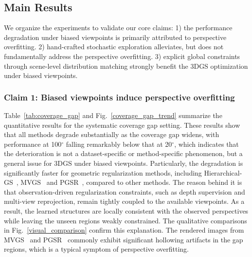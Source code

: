 \documentclass[lettersize,journal]{IEEEtran}
\begin{document}
\subsection{Main Results}


We organize the experiments to validate our core claims: 
1) the performance degradation under biased viewpoints is primarily attributed 
to perspective overfitting.
2) hand-crafted stochastic exploration alleviates, but does not fundamentally address the perspective overfitting. 
3) explicit global constraints through scene-level distribution matching strongly benefit the 3DGS optimization under biased viewpoints. 


\subsubsection{Claim 1: Biased viewpoints induce perspective overfitting}


Table~\ref{tab:coverage_gap} and Fig.~\ref{coverage_gap_trend} summarize the quantitative results for the systematic coverage gap setting. 
These results show that all methods degrade substantially as the coverage gap widens, with performance at 100$^\circ$ falling remarkably below that at 20$^\circ$,
which indicates that the deterioration is not a dataset-specific or method-specific phenomenon, but a general issue for 3DGS under biased viewpoints.
Particularly, the degradation is significantly faster for geometric regularization methods, including Hierarchical-GS~\cite{hierarchical}, MVGS~\cite{mvgs} and PGSR~\cite{pgsr}, compared to other methods.
The reason behind it is that observation-driven regularization constraints, such as depth supervision and multi-view reprojection, remain tightly coupled to the available viewpoints. As a result, the learned structures are locally consistent with the observed perspectives while leaving the unseen regions weakly constrained. 
The qualitative comparisons in Fig.~\ref{visual_comparison} confirm this explanation. The rendered images from MVGS~\cite{mvgs} and PGSR~\cite{pgsr} commonly exhibit significant hollowing artifacts in the gap regions, which is a typical symptom of perspective overfitting.
\end{document}
